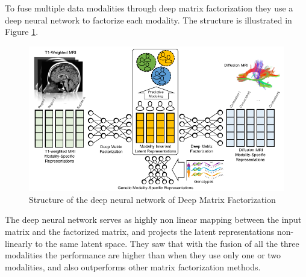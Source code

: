 To fuse multiple data modalities through deep matrix factorization they use a deep neural network to factorize each modality. The structure is illustrated in Figure \ref{fig:diagram17}.
\vspace{0.5cm}

\begin{figure}[htbp]
	\centering
	\includegraphics[scale=0.65]{Immagini/multimodality.PNG}
	\caption{Structure of the deep neural network of Deep Matrix Factorization}
	\label{fig:diagram17}
\end{figure}

The deep neural network serves as highly non linear mapping between the input matrix and the factorized matrix, and projects the latent representations non-linearly to the same latent space. 
They saw that with the fusion of all the three modalities the performance are higher than when they use only one or two modalities, and also outperforms other matrix factorization methods.